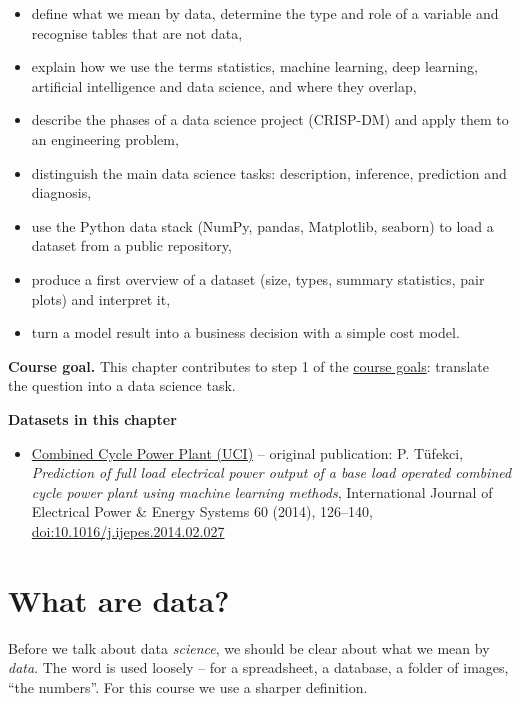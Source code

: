 \documentclass[
  letterpaper,
  DIV=11,
  numbers=noendperiod]{scrreprt}
\providecommand{\tightlist}{%
  \setlength{\itemsep}{0pt}\setlength{\parskip}{0pt}}\usepackage{longtable,booktabs,array}
\begin{document}
\begin{itemize}
\tightlist
\item
  define what we mean by data, determine the type and role of a variable
  and recognise tables that are not data,
\item
  explain how we use the terms statistics, machine learning, deep
  learning, artificial intelligence and data science, and where they
  overlap,
\item
  describe the phases of a data science project (CRISP-DM) and apply
  them to an engineering problem,
\item
  distinguish the main data science tasks: description, inference,
  prediction and diagnosis,
\item
  use the Python data stack (NumPy, pandas, Matplotlib, seaborn) to load
  a dataset from a public repository,
\item
  produce a first overview of a dataset (size, types, summary
  statistics, pair plots) and interpret it,
\item
  turn a model result into a business decision with a simple cost model.
\end{itemize}

\textbf{Course goal.} This chapter contributes to step 1 of the
\hyperref[what-you-will-be-able-to-do]{course goals}: translate the
question into a data science task.

\textbf{Datasets in this chapter}

\begin{itemize}
\tightlist
\item
  \href{https://archive.ics.uci.edu/dataset/294/combined+cycle+power+plant}{Combined
  Cycle Power Plant (UCI)} -- original publication: P. Tüfekci,
  \emph{Prediction of full load electrical power output of a base load
  operated combined cycle power plant using machine learning methods},
  International Journal of Electrical Power \& Energy Systems 60 (2014),
  126--140,
  \href{https://doi.org/10.1016/j.ijepes.2014.02.027}{doi:10.1016/j.ijepes.2014.02.027}
\end{itemize}

\section{What are data?}\label{what-are-data}

Before we talk about data \emph{science}, we should be clear about what
we mean by \emph{data}. The word is used loosely -- for a spreadsheet, a
database, a folder of images, ``the numbers''. For this course we use a
sharper definition.
\end{document}

